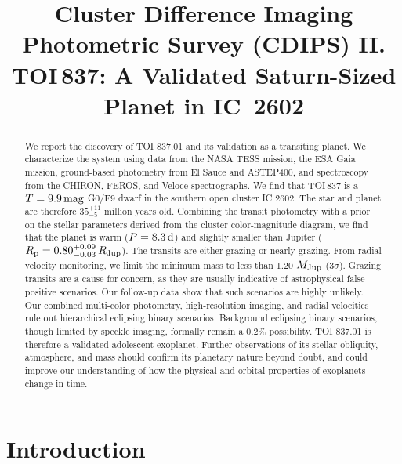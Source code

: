 \documentclass[12pt,twocolumn,tighten]{aastex63}
\begin{document}

\title{
  Cluster Difference Imaging Photometric Survey (CDIPS) II.
  TOI$\,$837: A Validated Saturn-Sized Planet in IC~2602
}



\begin{abstract}
  We report the discovery of TOI 837.01 and its validation as a
  transiting planet.  We characterize the system using data from the
  NASA TESS mission, the ESA Gaia mission, ground-based photometry from El Sauce
  and ASTEP400, and spectroscopy from the CHIRON, FEROS, and Veloce
  spectrographs.  We
  find that TOI$\,$837 is a $T=9.9\,{\rm mag}$ G0/F9 dwarf in the southern open
  cluster IC 2602.  The star and planet are therefore $35^{+11}_{-5}$
  million years old. Combining the transit photometry
  with a prior on the stellar parameters derived from the cluster
  color-magnitude diagram, we find that the 
  planet is warm ($P = 8.3\,{\rm d}$) and
  slightly smaller than Jupiter ($R_{\rm p} = 0.80^{+0.09}_{-0.03} \,R_{\rm Jup}$). 
  The transits are either grazing or nearly grazing.  From radial velocity
  monitoring, we limit the minimum mass to less than 1.20 $M_{\rm
  Jup}$ (3$\sigma$).  Grazing transits are a cause for concern, as
  they are usually indicative of astrophysical false positive
  scenarios.  Our follow-up data show that such scenarios are highly
  unlikely.  Our combined multi-color photometry, high-resolution
  imaging, and radial velocities rule out hierarchical eclipsing
  binary scenarios.  Background eclipsing binary scenarios, though
  limited by speckle imaging, formally remain a 0.2\% possibility.
  TOI 837.01 is therefore a validated adolescent exoplanet.  Further
  observations of its stellar obliquity, atmosphere, and mass should
  confirm its planetary nature beyond doubt, and could improve our
  understanding of how the physical and orbital properties of
  exoplanets change in time.
\end{abstract}




\section{Introduction}
\end{document}
